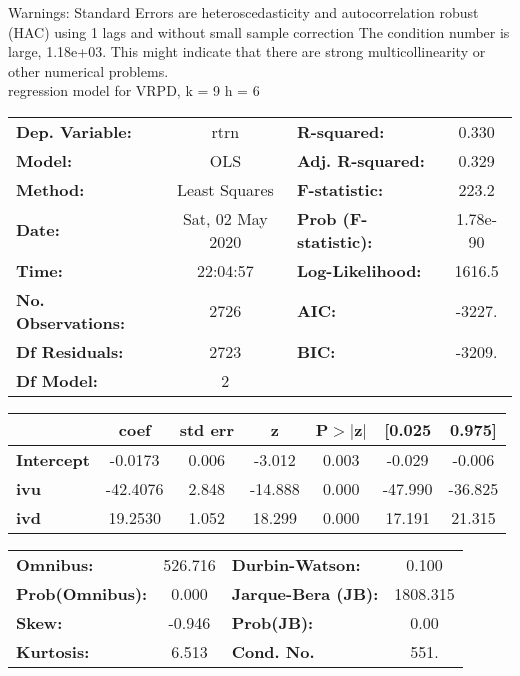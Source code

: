 Warnings: \newline
 [1] Standard Errors are heteroscedasticity and autocorrelation robust (HAC) using 1 lags and without small sample correction \newline
 [2] The condition number is large, 1.18e+03. This might indicate that there are \newline
 strong multicollinearity or other numerical problems.\\ 

regression model for VRPD, k = 9 h = 6\begin{center}
\begin{tabular}{lclc}
\toprule
\textbf{Dep. Variable:}    &       rtrn       & \textbf{  R-squared:         } &     0.330   \\
\textbf{Model:}            &       OLS        & \textbf{  Adj. R-squared:    } &     0.329   \\
\textbf{Method:}           &  Least Squares   & \textbf{  F-statistic:       } &     223.2   \\
\textbf{Date:}             & Sat, 02 May 2020 & \textbf{  Prob (F-statistic):} &  1.78e-90   \\
\textbf{Time:}             &     22:04:57     & \textbf{  Log-Likelihood:    } &    1616.5   \\
\textbf{No. Observations:} &        2726      & \textbf{  AIC:               } &    -3227.   \\
\textbf{Df Residuals:}     &        2723      & \textbf{  BIC:               } &    -3209.   \\
\textbf{Df Model:}         &           2      & \textbf{                     } &             \\
\bottomrule
\end{tabular}
\begin{tabular}{lcccccc}
                   & \textbf{coef} & \textbf{std err} & \textbf{z} & \textbf{P$> |$z$|$} & \textbf{[0.025} & \textbf{0.975]}  \\
\midrule
\textbf{Intercept} &      -0.0173  &        0.006     &    -3.012  &         0.003        &       -0.029    &       -0.006     \\
\textbf{ivu}       &     -42.4076  &        2.848     &   -14.888  &         0.000        &      -47.990    &      -36.825     \\
\textbf{ivd}       &      19.2530  &        1.052     &    18.299  &         0.000        &       17.191    &       21.315     \\
\bottomrule
\end{tabular}
\begin{tabular}{lclc}
\textbf{Omnibus:}       & 526.716 & \textbf{  Durbin-Watson:     } &    0.100  \\
\textbf{Prob(Omnibus):} &   0.000 & \textbf{  Jarque-Bera (JB):  } & 1808.315  \\
\textbf{Skew:}          &  -0.946 & \textbf{  Prob(JB):          } &     0.00  \\
\textbf{Kurtosis:}      &   6.513 & \textbf{  Cond. No.          } &     551.  \\
\bottomrule
\end{tabular}
\end{center}


